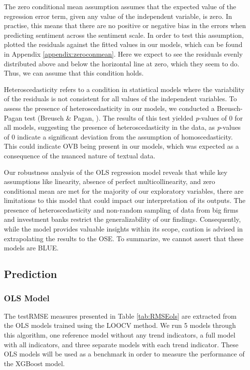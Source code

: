 The zero conditional mean assumption assumes that the expected value of the regression error term, given any value of the independent variable, is zero. In practise, this means that there are no positive or negative bias in the errors when predicting sentiment across the sentiment scale. In order to test this assumption, plotted the residuals against the fitted values in our models, which can be found in Appendix \ref{appendix:zeroconmean}. Here we expect to see the residuals evenly distributed above and below the horizontal line at zero, which they seem to do. Thus, we can assume that this condition holds.

Heteroscedasticity refers to a condition in statistical models where the variability of the residuals is not consistent for all values of the independent variables. To assess the presence of heteroscedasticity in our models, we conducted a Breusch-Pagan test (Breusch \& Pagan, \cite*{breusch1979simple}). The results of this test yielded \textit{p}-values of 0 for all models, suggesting the presence of heteroscedasticity in the data, as \textit{p}-values of 0 indicate a significant deviation from the assumption of homoscedasticity. This could indicate OVB being present in our models, which was expected as a consequence of the nuanced nature of textual data.

Our robustness analysis of the OLS regression model reveals that while key assumptions like linearity, absence of perfect multicollinearity, and zero conditional mean are met for the majority of our exploratory variables, there are limitations to this model that could impact our interpretation of its outputs. The presence of heteroscedasticity and non-random sampling of data from big firms and investment banks restrict the generalizability of our findings. Consequently, while the model provides valuable insights within its scope, caution is advised in extrapolating the results to the OSE. To summarize, we cannot assert that these models are BLUE.

\subsection{Prediction}
\label{chap:Prediction}
\subsubsection{OLS Model} \label{sec:OLSpred}
The testRMSE measures presented in Table \ref{tab:RMSEols} are extracted from the OLS models trained using the LOOCV method. We run 5 models through this algorithm, one reference model without any trend indicators, a full model with all indicators, and three separate models with each trend indicator. These OLS models will be used as a benchmark in order to measure the performance of the XGBoost model.

